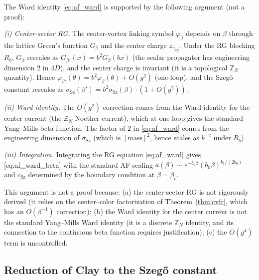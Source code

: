 \begin{remark}
\label{rem:ward_support}
The Ward identity \eqref{eq:af_ward} is supported by the following
argument (not a proof):

\emph{(i) Center-sector RG.} The center-vortex linking symbol
$\varphi_{\beta}$ depends on $\beta$ through the lattice Green's
function $G_{\beta}$ and the center charge $z_{\gamma_{xy}}$. Under
the RG blocking $R_{b}$, $G_{\beta}$ rescales as
$G_{\beta'}(x)=b^{2}G_{\beta}(bx)$ (the scalar propagator has
engineering dimension $2$ in $4D$), and the center charge is
invariant (it is a topological $\mathbb{Z}_{N}$ quantity). Hence
$\varphi_{\beta'}(\theta)=b^{2}\varphi_{\beta}(\theta)+O(g^{2})$
(one-loop), and the Szeg\H{o} constant rescales as
$\sigma_{\mathrm{Sz}}(\beta')=b^{2}\sigma_{\mathrm{Sz}}(\beta)\cdot
(1+O(g^{2}))$.

\emph{(ii) Ward identity.} The $O(g^{2})$ correction comes from the
Ward identity for the center current (the $\mathbb{Z}_{N}$
Noether current), which at one loop gives the standard
Yang--Mills beta function. The factor of $2$ in
\eqref{eq:af_ward} comes from the engineering dimension of
$\sigma_{\mathrm{Sz}}$ (which is $[\mathrm{mass}]^{2}$, hence
scales as $b^{-2}$ under $R_{b}$).

\emph{(iii) Integration.} Integrating the RG equation
\eqref{eq:af_ward} gives \eqref{eq:af_ward_beta} with the standard
AF scaling $a(\beta)\sim e^{-b_{0}\beta}(b_{0}\beta)^{b_{1}/(2b_{0})}$
and $c_{\mathrm{Sz}}$ determined by the boundary condition at
$\beta=\beta_{c}$.

This argument is not a proof because: (a) the center-sector RG is
not rigorously derived (it relies on the center--color
factorization of Theorem~\ref{thm:cvfr}, which has an
$O(\beta^{-1})$ correction); (b) the Ward identity for the center
current is not the standard Yang--Mills Ward identity (it is a
discrete $\mathbb{Z}_{N}$ identity, and its connection to the
continuous beta function requires justification); (c) the
$O(g^{4})$ term is uncontrolled.
\end{remark}

\subsection{Reduction of Clay to the Szeg\H{o} constant}
\label{ssec:clay_from_szego}

